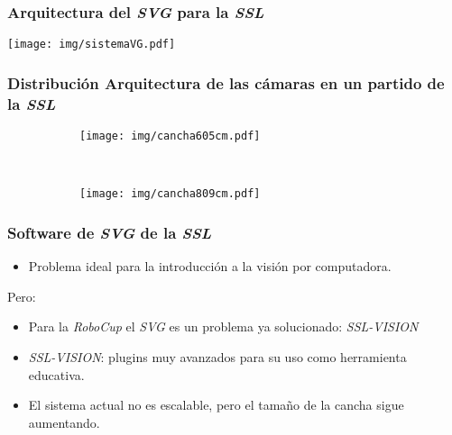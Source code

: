 \documentclass[11pt,a4paper,spanish]{beamer}
\begin{document}
\begin{frame}

\frametitle{Arquitectura del \emph{SVG} para la \emph{SSL}}

\texttt{[image: img/sistemaVG.pdf]}

\end{frame}

\begin{frame}

\frametitle{Distribución Arquitectura de las cámaras en un partido de la \emph{SSL}}

\begin{figure}[h]

	\centering

	\begin{subfigure}[c]{0.40\textwidth}
		\centering
		\texttt{[image: img/cancha605cm.pdf]}
	\end{subfigure}
	~
	\begin{subfigure}[c]{0.40\textwidth}
		\centering
		\texttt{[image: img/cancha809cm.pdf]}
	\end{subfigure}

\end{figure}

\end{frame}

\begin{frame}

\frametitle{Software de \emph{SVG} de la \emph{SSL}}

\begin{itemize}

	\item Problema ideal para la introducción a la visión por computadora.

\end{itemize}

Pero:

\begin{itemize}

	\item Para la \emph{RoboCup} el \emph{SVG} es un problema ya
		solucionado: \emph{SSL-VISION}

	\item \emph{SSL-VISION}: plugins muy avanzados para su uso como
		herramienta educativa.

	\item El sistema actual no es escalable, pero el tamaño de la cancha
		sigue aumentando.

\end{itemize}

\end{frame}
\end{document}
